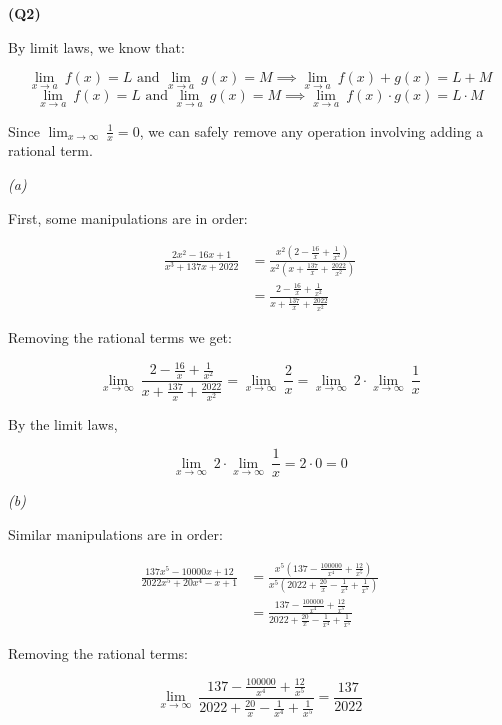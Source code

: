 \documentclass[12pt, a4paper]{article}
\newcommand{\displim}[1]{\displaystyle{\lim_{#1}}}
\begin{document}
\textbf{(Q2)}

By limit laws, we know that:

\[
    \displim{x \to a}\: f(x) = L \text{ and }
    \displim{x \to a}\: g(x) = M \implies
    \displim{x \to a}\: f(x) + g(x) = L + M
\]
\[
    \displim{x \to a}\: f(x) = L \text{ and }
    \displim{x \to a}\: g(x) = M \implies
    \displim{x \to a}\: f(x) \cdot g(x) = L \cdot M
\]

Since $\displim{x \to \infty}\: \tfrac{1}{x} = 0$, we can safely remove any
operation involving adding a rational term.

\textit{(a)}

First, some manipulations are in order:

\begin{align*}
    \frac{
        2x^2 - 16x + 1
    }{
        x^3 + 137x + 2022
    } & = 
    \frac{
        x^2(2 - \frac{16}{x} + \frac{1}{x^2})
    }{
        x^2(x + \frac{137}{x} + \frac{2022}{x^2})
    }\\ & = 
    \frac{
        2 - \frac{16}{x} + \frac{1}{x^2}
    }{
        x + \frac{137}{x} + \frac{2022}{x^2}
    }
\end{align*}

Removing the rational terms we get:

\[
    \displim{x \to \infty}\:\frac{2 - \frac{16}{x} + \frac{1}{x^2}}{x + \frac{137}{x} + \frac{2022}{x^2}}
    = \displim{x \to \infty}\: \frac{2}{x}
    = \displim{x \to \infty}\: 2 \cdot \displim{x \to \infty}\: \frac{1}{x}
\]

By the limit laws,

\[
    \displim{x \to \infty}\: 2 \cdot \displim{x \to \infty}\: \frac{1}{x} = 2 \cdot 0 = 0
\]

\textit{(b)}

Similar manipulations are in order:

\begin{align*}
    \frac{
        137x^5 - 10000x + 12
    }{
        2022x^5 + 20x^4 - x + 1
    } & =
    \frac{
        x^5(137 - \frac{100000}{x^4} + \frac{12}{x^5})
    }{
        x^5(2022 + \frac{20}{x} - \frac{1}{x^4} + \frac{1}{x^5})
    }\\ & =
    \frac{
        137 - \frac{100000}{x^4} + \frac{12}{x^5}
    }{
        2022 + \frac{20}{x} - \frac{1}{x^4} + \frac{1}{x^5}
    }
\end{align*}

Removing the rational terms:

\[
    \displim{x \to \infty}\: \frac{
        137 - \frac{100000}{x^4} + \frac{12}{x^5}
    }{
        2022 + \frac{20}{x} - \frac{1}{x^4} + \frac{1}{x^5}
    } = \frac{137}{2022}
\]
\end{document}
